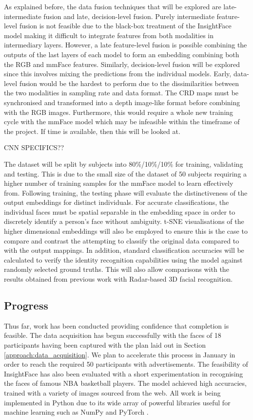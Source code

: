 \documentclass{interim}
\begin{document}
As explained before, the data fusion techniques that will be explored are late-intermediate fusion and late, decision-level fusion. Purely intermediate feature-level fusion is not feasible due to the black-box treatment of the InsightFace model making it difficult to integrate features from both modalities in intermediary layers. However, a late feature-level fusion is possible combining the outputs of the last layers of each model to form an embedding combining both the RGB and mmFace features. Similarly, decision-level fusion will be explored since this involves mixing the predictions from the individual models. Early, data-level fusion would be the hardest to perform due to the dissimilarities between the two modalities in sampling rate and data format. The CRD maps must be synchronised and transformed into a depth image-like format before combining with the RGB images. Furthermore, this would require a whole new training cycle with the mmFace model which may be infeasible within the timeframe of the project. If time is available, then this will be looked at.

CNN SPECIFICS??

The dataset will be split by subjects into 80\%/10\%/10\% for training, validating and testing. This is due to the small size of the dataset of 50 subjects requiring a higher number of training samples for the mmFace model to learn effectively from. Following training, the testing phase will evaluate the distinctiveness of the output embeddings for distinct individuals. For accurate classifications, the individual faces must be spatial separable in the embedding space in order to discretely identify a person's face without ambiguity. t-SNE visualisations \cite{van2008visualizing} of the higher dimensional embeddings will also be employed to ensure this is the case to compare and contrast the attempting to classify the original data compared to with the output mappings. In addition, standard classification accuracies will be calculated to verify the identity recognition capabilities using the model against randomly selected ground truths. This will also allow comparisons with the results obtained from previous work with Radar-based 3D facial recognition.


\subsection{Progress}
\label{approach:progress}
Thus far, work has been conducted providing confidence that completion is feasible. The data acquisition has begun successfully with the faces of 18 participants having been captured with the plan laid out in Section \ref{approach:data_acquisition}. We plan to accelerate this process in January in order to reach the required 50 participants with advertisements. The feasibility of InsightFace has also been evaluated with a short experimentation in recognising the faces of famous NBA basketball players. The model achieved high accuracies, trained with a variety of images sourced from the web. All work is being implemented in Python due to its wide array of powerful libraries useful for machine learning such as NumPy \cite{harris2020array} and PyTorch \cite{paszke2019pytorch}.
\end{document}
